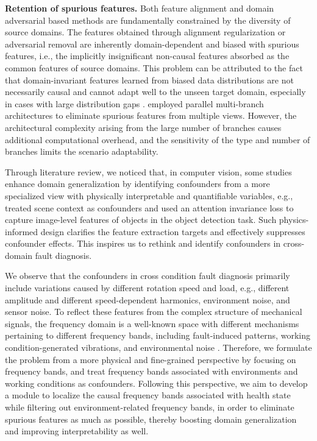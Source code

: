 \documentclass{article}
\begin{document}
	\textbf{Retention of spurious features.} Both feature alignment and domain adversarial based methods are fundamentally constrained by the diversity of source domains. The features obtained through alignment regularization or adversarial removal are inherently domain-dependent and biased with spurious features, i.e., the implicitly insignificant non-causal features absorbed as the common features of source domains. This problem can be attributed to the fact that domain-invariant features learned from biased data distributions are not necessarily causal and cannot adapt well to the unseen target domain, especially in cases with large distribution gaps \cite{RN2}. \cite{RN1} employed parallel multi-branch architectures to eliminate spurious features from multiple views. However, the architectural complexity arising from the large number of branches causes additional computational overhead, and the sensitivity of the type and number of branches limits the scenario adaptability.
	
	Through literature review, we noticed that, in computer vision, some studies enhance domain generalization by identifying confounders from a more specialized view with physically interpretable and quantifiable variables, e.g., \cite{RN2} treated scene context as confounders and used an attention invariance loss to capture image-level features of objects in the object detection task. Such physics-informed design clarifies the feature extraction targets and effectively suppresses confounder effects. This inspires us to rethink and identify confounders in cross-domain fault diagnosis. 
	
	We observe that the confounders in cross condition fault diagnosis primarily include variations caused by different rotation speed and load, e.g., different amplitude and different speed-dependent harmonics, environment noise, and sensor noise. To reflect these features from the complex structure of mechanical signals, the frequency domain is a well-known space with different mechanisms pertaining to different frequency bands, including fault-induced patterns, working condition-generated vibrations, and environmental noise \cite{RN4}. Therefore, we formulate the problem from a more physical and fine-grained perspective by focusing on frequency bands, and treat frequency bands associated with environments and working conditions as confounders. Following this perspective, we aim to develop a module to localize the causal frequency bands associated with health state while filtering out environment-related frequency bands, in order to eliminate spurious features as much as possible, thereby boosting domain generalization and improving interpretability as well.
	
\end{document}
